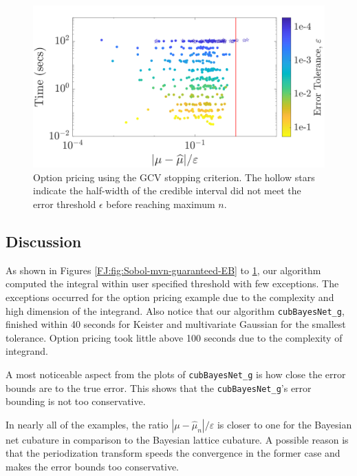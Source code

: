 \documentclass[graybox,footinfo]{svmult}
\newcommand{\abs}[1]{\left\lvert #1 \right\rvert} %
\newcommand{\FJHNote}[1]{{\textcolor{blue}{FJH: #1}}}
\newcommand{\JRNote}[1]{{\textcolor{green}{JR: #1}}}
\begin{document}
\begin{figure}
\centering
\includegraphics[width=0.95\linewidth]{"figures/Sobol/Sobol_optPrice_guaranteed_time_GCV__d12_r1_2019-Sep-1"}
\caption[Sobol: Option pricing guaranteed: GCV]{Option pricing using the GCV stopping criterion. The hollow stars indicate the half-width of the credible interval did not meet the error threshold $\epsilon$ before reaching maximum $n$.}
\label{FJ:fig:Sobol-optprice-guaranteed-GCV}
\end{figure}




\subsection{Discussion}

As shown in Figures \ref{FJ:fig:Sobol-mvn-guaranteed-EB} to \ref{FJ:fig:Sobol-optprice-guaranteed-GCV}, our algorithm computed the integral within user specified threshold with few exceptions. The exceptions occurred for the  option pricing example due to the complexity and high dimension of the integrand. 
Also notice that our algorithm \texttt{cubBayesNet\_g}, finished within 40 seconds for Keister and multivariate Gaussian for the smallest tolerance. Option pricing took little above 100 seconds due to the complexity of integrand.

A most noticeable aspect from the plots of \texttt{cubBayesNet\_g} is how close the error bounds are to the true error. 
This shows that the \texttt{cubBayesNet\_g}'s error bounding is not too conservative.

In nearly all of the examples, the ratio $\abs{\mu - \widehat{\mu}_n}/\varepsilon$  is closer to one for the Bayesian net cubature in comparison to the Bayesian lattice cubature.  
A possible reason is that the periodization transform speeds the convergence in the former case and makes the error bounds too conservative.
\end{document}
